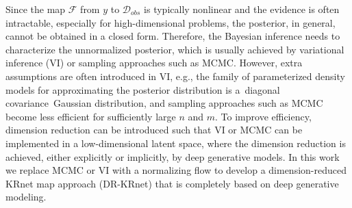 Since the map $\mathcal{F}$ from $y$ to $\mathcal{D}_{obs}$ is typically nonlinear and the evidence is often intractable, especially for high-dimensional problems, the posterior, in general, cannot be obtained in a closed form. Therefore, the Bayesian inference needs to characterize the unnormalized posterior, which is usually achieved by variational inference (VI) or sampling approaches such as MCMC. However, extra assumptions are often introduced in VI, e.g., the family of parameterized density models for approximating the posterior distribution is a diagonal covariance Gaussian distribution, and sampling approaches such as MCMC become less efficient for sufficiently large $n$ and $m$. To improve efficiency, dimension reduction can be introduced such that VI \cite{goh2022solving,xia2023vi} or MCMC \cite{xia2022bayesian,patel2022solution} can be implemented in a low-dimensional latent space, where the dimension reduction is achieved, either explicitly or implicitly, by deep generative models. In this work we replace MCMC or VI with a normalizing flow to develop a dimension-reduced KRnet map approach (DR-KRnet) that is completely based on deep generative modeling.

